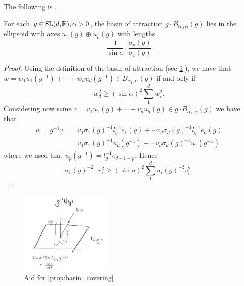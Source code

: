 \documentclass{report}
\begin{document}
The following is \cite[Proposition 3.8]{pozzetti_anosov_2023}.
\begin{proposition}\label{prop:basin_covering}
For each $g\in \operatorname{{\mathrm{SL}}}(d, \mathbb R), \alpha > 0$, 
the basin of attraction $g \cdot B_{\alpha_1, \alpha}(g)$ lies in the ellipsoid with axes $u_1(g) \oplus u_p(g)$ with lengths
\[
    \frac{1}{\sin \alpha} \cdot \frac{\sigma_p(g)}{\sigma_1(g)}
\]
\end{proposition}
\begin{proof}
Using the definition of the basin of attraction (see \cref{fig:projection} ), we have that $w = w_1 u_1(g^{-1}) + \cdots + w_d u_d(g^{-1}) \in B_{\alpha_1, \alpha}(g)$ if and only if
\[
    w_d^2 \geq (\sin \alpha)^2 \sum_1^d w_i^2.
\]
Considering now some $v = v_1 u_1(g) + \cdots + v_d u_d(g) \in g \cdot B_{\alpha_1, \alpha}(g)$
we have that
\begin{align*}
    w = g^{-1} v &= v_1 \sigma_1(g)^{-1} l_g^{-1} e_1(g) + \cdots v_d \sigma_d(g)^{-1} l_g^{-1} e_d(g)\\
    &= v_1 \sigma_1(g)^{-1} u_{d}(g^{-1}) + \cdots v_d \sigma_d(g)^{-1} u_1(g^{-1})
\end{align*}
where we used that $u_p(g^{-1}) = l_g^{-1} e_{d+1-p}$.
Hence
\[
    \sigma_1(g)^{-2} \cdot v_1^2 \geq (\sin a)^2 \sum_1^d \sigma_i(g)^{-2} v_i^2.
\]
\end{proof}
\begin{figure}[h]
    \centering
    \includegraphics[width=0.4\textwidth]{projection.jpg}
    \caption{Aid for \cref{prop:basin_covering}}
    \label{fig:projection}
\end{figure}
\end{document}
